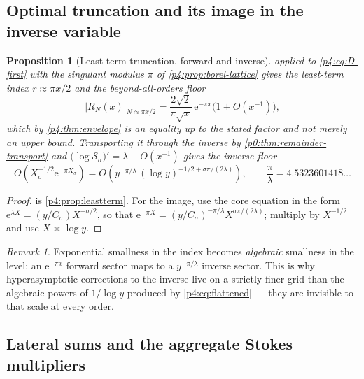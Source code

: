 \documentclass[11pt,a4paper,oneside]{book}
\theoremstyle{plain}
\newtheorem{proposition}[theorem]{Proposition}
\theoremstyle{definition}
\theoremstyle{remark}
\newtheorem{remark}[theorem]{Remark}
\newcommand{\e}{\mathrm{e}}
\newcommand{\Xcore}{X}
\begin{document}
\subsection{Optimal truncation and its image in the inverse variable}

\begin{proposition}[Least-term truncation, forward and inverse]
\label{p4:prop:optimal}
 applied to \cref{p4:eq:D-first} with the
singulant modulus $\pi$ of \cref{p4:prop:borel-lattice} gives the least-term
index $r\approx\pi x/2$ and the beyond-all-orders floor
\begin{equation}
  \bigl|R_{N}(x)\bigr|_{N\approx\pi x/2}
  =\frac{2\sqrt2}{\pi\sqrt x}\,\e^{-\pi x}\bigl(1+O(x^{-1})\bigr),
  \label{p4:eq:floor-forward}
\end{equation}
which by \cref{p4:thm:envelope} is an equality up to the stated factor and not
merely an upper bound.  Transporting it through the inverse by
\cref{p0:thm:remainder-transport} and
$\bigl(\log\mathcal S_\sigma\bigr)'=\lambda+O(x^{-1})$ gives the inverse floor
\begin{equation}
  O\!\left(\Xcore_\sigma^{-1/2}\e^{-\pi \Xcore_\sigma}\right)
  =O\!\left(y^{-\pi/\lambda}\,
    (\log y)^{-1/2+\sigma\pi/(2\lambda)}\right),
  \qquad
  \frac\pi\lambda=4.5323601418\ldots
  \label{p4:eq:floor-inverse}
\end{equation}
\end{proposition}

\begin{proof}
 is \cref{p4:prop:leastterm}.  For the image, use the
core equation in the form $\e^{\lambda \Xcore}=(y/C_\sigma)\Xcore^{-\sigma/2}$,
so that
$\e^{-\pi \Xcore}=(y/C_\sigma)^{-\pi/\lambda}\Xcore^{\sigma\pi/(2\lambda)}$;
multiply by $\Xcore^{-1/2}$ and use $\Xcore\asymp\log y$.
\end{proof}

\begin{remark}
Exponential smallness in the index becomes \emph{algebraic} smallness in the
level: an $\e^{-\pi x}$ forward sector maps to a $y^{-\pi/\lambda}$ inverse
sector.  This is why hyperasymptotic corrections to the inverse live on a
strictly finer grid than the algebraic powers of $1/\log y$ produced by
\cref{p4:eq:flattened} --- they are invisible to that scale at every order.
\end{remark}

\subsection{Lateral sums and the aggregate Stokes multipliers}
\end{document}
